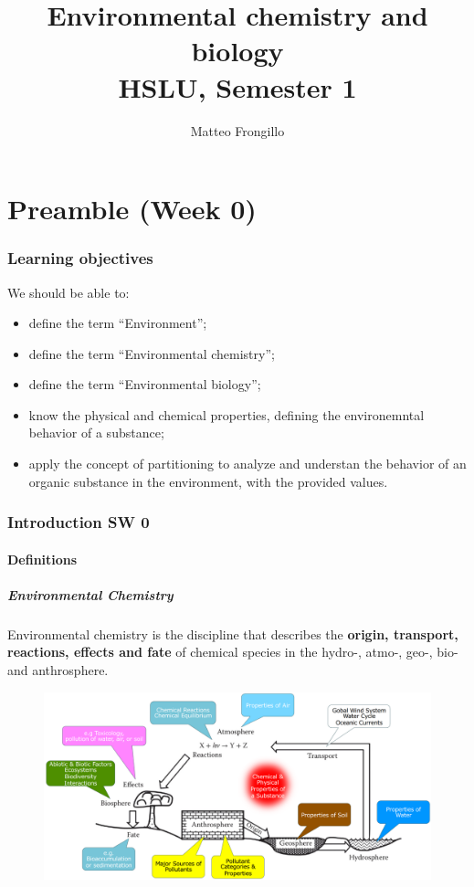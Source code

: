 \documentclass{article}
\title{\textbf{Environmental chemistry and biology \\ HSLU, Semester 1}}
\author{Matteo Frongillo}
\newcommand{\cfig}[1]{%
  \begin{figure}[ht!]%
    \centering%
    #1%
  \end{figure}%
}
\begin{document}
\maketitle
\tableofcontents
\pagebreak

\part*{Preamble (Week 0)}
\section{Learning objectives}
We should be able to:
\begin{itemize}
    \item define the term ``Environment'';
    \item define the term ``Environmental chemistry'';
    \item define the term ``Environmental biology'';
    \item know the physical and chemical properties,
        defining the environemntal behavior of a substance;
    \item apply the concept of partitioning to analyze and understan
        the behavior of an organic substance in the environment, with
        the provided values.
\end{itemize}

\newpage
\section{Introduction SW 0}
\subsection{Definitions}
\subsubsection{Environmental Chemistry}
Environmental chemistry is the discipline that describes the \textbf{origin,
transport, reactions, effects and fate} of chemical species in the
hydro-, atmo-, geo-, bio- and anthrosphere.

\cfig{\includegraphics*[width=.9\textwidth]{media/env-chemistry.png}}
\end{document}
